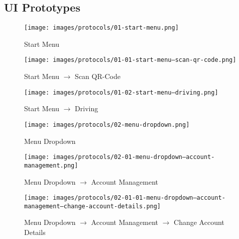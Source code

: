 \documentclass[a4paper, 12pt]{article}
\begin{document}
\newpage
\subsection{UI Prototypes}
\begin{figure} [htbp]
  \begin{center}
    \texttt{[image: images/protocols/01-start-menu.png]}
  \end{center}
  \caption{Start Menu}
\end{figure}

\begin{figure} [htbp]
  \begin{center}
    \texttt{[image: images/protocols/01-01-start-menu--scan-qr-code.png]}
  \end{center}
  \caption{Start Menu $\rightarrow$ Scan QR-Code}
\end{figure}

\begin{figure} [htbp]
  \begin{center}
    \texttt{[image: images/protocols/01-02-start-menu---driving.png]}
  \end{center}
  \caption{Start Menu $\rightarrow$ Driving}
\end{figure}

\begin{figure} [htbp]
  \begin{center}
    \texttt{[image: images/protocols/02-menu-dropdown.png]}
  \end{center}
  \caption{Menu Dropdown}
\end{figure}

\begin{figure} [htbp]
  \begin{center}
    \texttt{[image: images/protocols/02-01-menu-dropdown--account-management.png]}
  \end{center}
  \caption{Menu Dropdown $\rightarrow$ Account Management}
\end{figure}

\begin{figure} [htbp]
  \begin{center}
    \texttt{[image: images/protocols/02-01-01-menu-dropdown--account-management--change-account-details.png]}
  \end{center}
  \caption{Menu Dropdown $\rightarrow$ Account Management $\rightarrow$ Change Account Details}
\end{figure}
\end{document}
